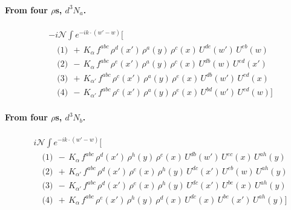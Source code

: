 \documentclass[10pt]{article}
\numberwithin{equation}{section}
\newcommand{\NN}{\mathcal N}
\begin{document}
\paragraph{From four $\rho$\textquotesingle s, $d^3N_a$.}
\begin{align*}
&-i\NN\int e^{-ik\cdot(w'-w)}\Big[\\
&\quad\text{(1)}\ \ +\,K_{\alpha}\,f^{abc}\,\rho^{d}(x')\,\rho^{a}(y)\,\rho^{c}(x)\,U^{de}(w')\,U^{eb}(w)\\
&\quad\text{(2)}\ \ -\,K_{\alpha}\,f^{abc}\,\rho^{e}(x')\,\rho^{a}(y)\,\rho^{c}(x)\,U^{db}(w)\,U^{ed}(x')\\
&\quad\text{(3)}\ \ +\,K_{\alpha'}\,f^{abc}\,\rho^{c}(x')\,\rho^{a}(y)\,\rho^{e}(x)\,U^{db}(w')\,U^{ed}(x)\\
&\quad\text{(4)}\ \ -\,K_{\alpha'}\,f^{abc}\,\rho^{c}(x')\,\rho^{a}(y)\,\rho^{e}(x)\,U^{bd}(w')\,U^{ed}(w)\Big]
\end{align*}
\paragraph{From four $\rho$\textquotesingle s, $d^3N_b$.}
\begin{align*}
&i\NN\int e^{-ik\cdot(w'-w)}\Big[\\
&\quad\text{(1)}\ \ -\,K_{\alpha}\,f^{abc}\,\rho^{d}(x')\,\rho^{h}(y)\,\rho^{e}(x)\,U^{db}(w')\,U^{ec}(x)\,U^{ah}(y)\\
&\quad\text{(2)}\ \ +\,K_{\alpha'}\,f^{abc}\,\rho^{d}(x')\,\rho^{e}(x)\,\rho^{h}(y)\,U^{dc}(x')\,U^{eb}(w)\,U^{ah}(y)\\
&\quad\text{(3)}\ \ -\,K_{\alpha'}\,f^{abc}\,\rho^{d}(x')\,\rho^{e}(x)\,\rho^{h}(y)\,U^{dc}(x')\,U^{be}(x)\,U^{ah}(y)\\
&\quad\text{(4)}\ \ +\,K_{\alpha}\,f^{abc}\,\rho^{e}(x')\,\rho^{h}(y)\,\rho^{d}(x)\,U^{dc}(x)\,U^{be}(x')\,U^{ah}(y)\Big]
\end{align*}
\end{document}
